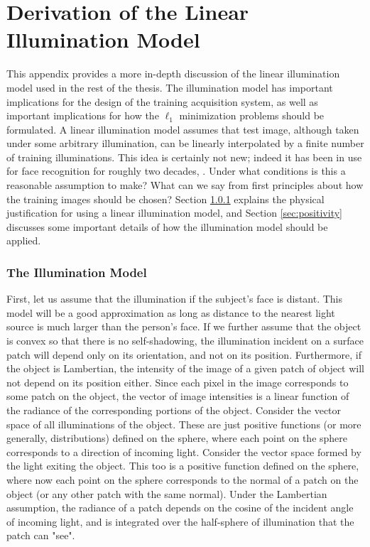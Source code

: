 \chapter{Derivation of the Linear Illumination Model}
\label{chap:appendix_illumination}

This appendix provides a more in-depth discussion of the linear illumination
model used in the rest of the thesis.  The illumination model has important
implications for the design of the training acquisition system, as well
as important implications for how the $\ell_1$ minimization problems should
be formulated.
A linear illumination model assumes that test image, although taken under some
arbitrary illumination, can be linearly interpolated by a finite number of
training illuminations.  This idea is certainly not new; indeed it has been in
use for face recognition for roughly two decades, \cite{Turk1991-CVPR}.  Under
what conditions is this a reasonable assumption to make?  What can we say from
first principles about how the training images should be chosen?  
Section \ref{sec:illumination_derivation} explains the physical justification
for using a linear illumination model, and Section \ref{sec:positivity}
discusses some important details of how the illumination model should be 
applied.

\subsection{The Illumination Model}
\label{sec:illumination_derivation}
%
First, let us assume that the illumination if the subject's face is distant.
This model will be a good approximation as long as distance to the nearest
light source is much larger than the person's face.  If we further assume that
the object is convex so that there is no self-shadowing, the illumination
incident on a surface patch will depend only on its orientation, and not on its
position.  Furthermore, if the object is Lambertian, the intensity of the image
of a given patch of object will not depend on its position either.  Since each
pixel in the image corresponds to some patch on the object, the vector of image
intensities is a linear function of the radiance of the corresponding portions
of the object.  Consider the vector space of all illuminations of the object.
These are just positive functions (or more generally, distributions) defined on
the sphere, where each point on the sphere corresponds to a direction of
incoming light.  Consider the vector space formed by the light exiting the
object.  This too is a positive function defined on the sphere, where now each
point on the sphere corresponds to the normal of a patch on the object (or any
other patch with the same normal).  Under the Lambertian assumption, the
radiance of a patch depends on the cosine of the incident angle of incoming
light, and is integrated over the half-sphere of illumination that the patch
can "see".

